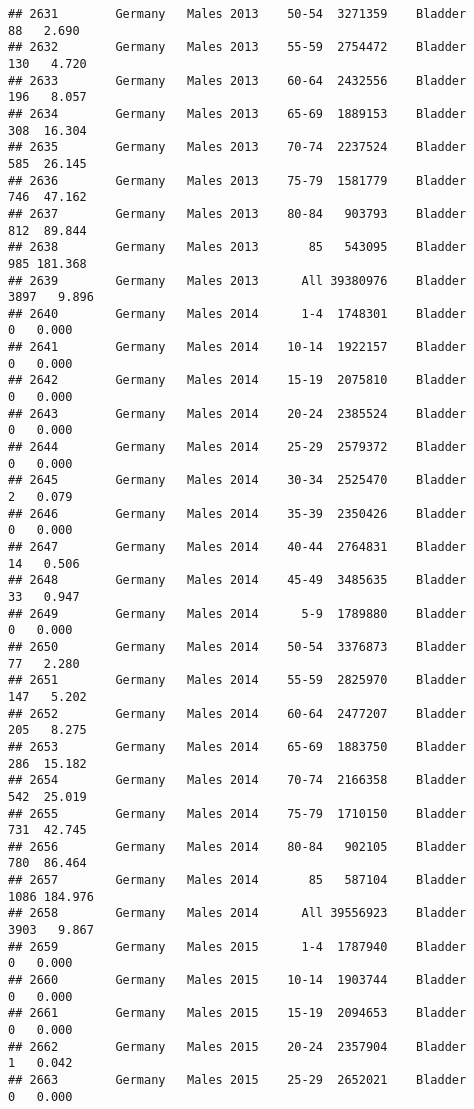 \documentclass[
]{article}
\begin{document}
\begin{verbatim}
## 2631        Germany   Males 2013    50-54  3271359    Bladder     88   2.690
## 2632        Germany   Males 2013    55-59  2754472    Bladder    130   4.720
## 2633        Germany   Males 2013    60-64  2432556    Bladder    196   8.057
## 2634        Germany   Males 2013    65-69  1889153    Bladder    308  16.304
## 2635        Germany   Males 2013    70-74  2237524    Bladder    585  26.145
## 2636        Germany   Males 2013    75-79  1581779    Bladder    746  47.162
## 2637        Germany   Males 2013    80-84   903793    Bladder    812  89.844
## 2638        Germany   Males 2013       85   543095    Bladder    985 181.368
## 2639        Germany   Males 2013      All 39380976    Bladder   3897   9.896
## 2640        Germany   Males 2014      1-4  1748301    Bladder      0   0.000
## 2641        Germany   Males 2014    10-14  1922157    Bladder      0   0.000
## 2642        Germany   Males 2014    15-19  2075810    Bladder      0   0.000
## 2643        Germany   Males 2014    20-24  2385524    Bladder      0   0.000
## 2644        Germany   Males 2014    25-29  2579372    Bladder      0   0.000
## 2645        Germany   Males 2014    30-34  2525470    Bladder      2   0.079
## 2646        Germany   Males 2014    35-39  2350426    Bladder      0   0.000
## 2647        Germany   Males 2014    40-44  2764831    Bladder     14   0.506
## 2648        Germany   Males 2014    45-49  3485635    Bladder     33   0.947
## 2649        Germany   Males 2014      5-9  1789880    Bladder      0   0.000
## 2650        Germany   Males 2014    50-54  3376873    Bladder     77   2.280
## 2651        Germany   Males 2014    55-59  2825970    Bladder    147   5.202
## 2652        Germany   Males 2014    60-64  2477207    Bladder    205   8.275
## 2653        Germany   Males 2014    65-69  1883750    Bladder    286  15.182
## 2654        Germany   Males 2014    70-74  2166358    Bladder    542  25.019
## 2655        Germany   Males 2014    75-79  1710150    Bladder    731  42.745
## 2656        Germany   Males 2014    80-84   902105    Bladder    780  86.464
## 2657        Germany   Males 2014       85   587104    Bladder   1086 184.976
## 2658        Germany   Males 2014      All 39556923    Bladder   3903   9.867
## 2659        Germany   Males 2015      1-4  1787940    Bladder      0   0.000
## 2660        Germany   Males 2015    10-14  1903744    Bladder      0   0.000
## 2661        Germany   Males 2015    15-19  2094653    Bladder      0   0.000
## 2662        Germany   Males 2015    20-24  2357904    Bladder      1   0.042
## 2663        Germany   Males 2015    25-29  2652021    Bladder      0   0.000

\end{verbatim}
\end{document}
